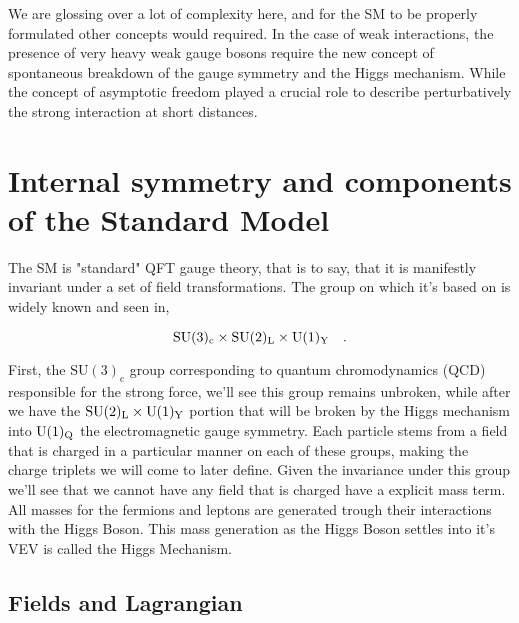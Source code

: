 We are glossing over a lot of complexity here, and for the SM to be properly formulated other concepts would required. In the case of weak interactions, the presence of very heavy weak gauge bosons require the new concept of spontaneous breakdown of the gauge symmetry and the Higgs mechanism. While 
%
the concept of asymptotic freedom played a crucial role to describe perturbatively the strong interaction at short distances.  
% 

\section{Internal symmetry and components of the Standard Model}

The SM is "standard" QFT gauge theory, that is to say, that it is manifestly invariant under a set of field transformations. The group on which it's based on is widely known and seen in, 

\begin{equation}
\mathrm{SU}(3)_{\mathrm{c}} \times \mathrm{SU}(2)_{\mathrm{L}} \times \mathrm{U}(1)_{\mathrm{Y}} \quad  .
\label{eq:SM Group}
\end{equation} 

First, the $\mathrm{SU}(3)_{\mathrm{c}}$ group corresponding to quantum chromodynamics (QCD) responsible for the strong force,  we'll see this group remains unbroken, while after we have the $\mathrm{SU}(2)_{\mathrm{L}} \times \mathrm{U}(1)_{\mathrm{Y}}$ portion that will be broken by the Higgs mechanism into $\mathrm{U}(1)_{\mathrm{Q}}$ the electromagnetic gauge symmetry. Each particle stems from a field that is charged in a particular manner on each of these groups, making the charge triplets we will come to later define. Given the invariance under this group we'll see that we cannot have any field that is charged have a explicit mass term. { \color{gray} All masses for the fermions and leptons are generated trough their interactions with the Higgs Boson. This mass generation as the Higgs Boson settles into it's VEV is called the Higgs Mechanism. } 

\subsection{Fields and Lagrangian}

